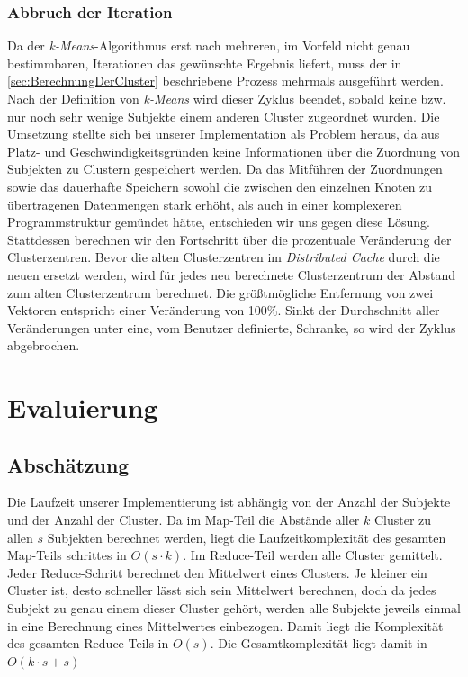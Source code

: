 \documentclass[a4paper]{llncs}
\begin{document}
\subsubsection{Abbruch der Iteration}
Da der \emph{k-Means}-Algorithmus erst nach mehreren, im Vorfeld nicht genau bestimmbaren, Iterationen das gewünschte Ergebnis liefert,
muss der in \ref{sec:BerechnungDerCluster} beschriebene Prozess mehrmals ausgeführt werden.
Nach der Definition von \emph{k-Means} wird dieser Zyklus beendet, sobald keine bzw. nur noch sehr wenige Subjekte einem anderen Cluster zugeordnet wurden.
Die Umsetzung stellte sich bei unserer Implementation als Problem heraus, da aus Platz- und Geschwindigkeitsgründen keine Informationen über die Zuordnung von Subjekten zu Clustern gespeichert werden. 
Da das Mitführen der Zuordnungen sowie das dauerhafte Speichern sowohl die zwischen den einzelnen Knoten zu übertragenen Datenmengen stark erhöht, als auch in einer komplexeren Programmstruktur gemündet hätte, entschieden wir uns gegen diese Lösung. 
Stattdessen berechnen wir den Fortschritt über die prozentuale Veränderung der Clusterzentren. Bevor die alten Clusterzentren im \emph{Distributed Cache} durch die neuen ersetzt werden, wird für jedes neu berechnete Clusterzentrum der Abstand zum alten Clusterzentrum berechnet.
Die größtmögliche Entfernung von zwei Vektoren entspricht einer Veränderung von 100\%. Sinkt der Durchschnitt aller Veränderungen unter eine, vom Benutzer definierte, Schranke, so wird der Zyklus abgebrochen.

\section{Evaluierung}

\subsection{Abschätzung}
Die Laufzeit unserer Implementierung ist abhängig von der Anzahl der Subjekte und der Anzahl der Cluster. Da im Map-Teil die Abstände aller $k$ Cluster zu allen $s$ Subjekten berechnet werden, liegt die Laufzeitkomplexität des gesamten Map-Teils schrittes in $O(s \cdot k)$. Im Reduce-Teil werden alle Cluster gemittelt. Jeder Reduce-Schritt berechnet den Mittelwert eines Clusters. Je kleiner ein Cluster ist, desto schneller lässt sich sein Mittelwert berechnen, doch da jedes Subjekt zu genau einem dieser Cluster gehört, werden alle Subjekte jeweils einmal in eine Berechnung eines Mittelwertes einbezogen. Damit liegt die Komplexität des gesamten Reduce-Teils in $O(s)$.
Die Gesamtkomplexität liegt damit in $O(k \cdot s + s)$
\end{document}
